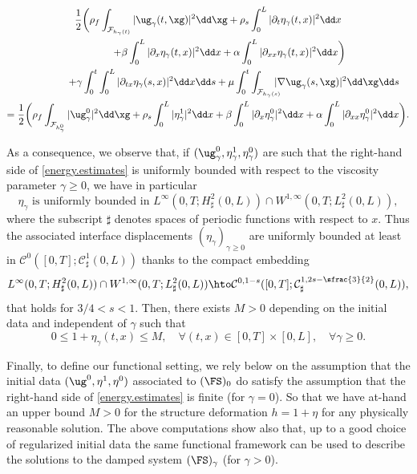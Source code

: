 \begin{multline}\label{energy.estimates}
\frac{1}{2}\biggl(\rho_{f}\int_{\mathcal{F}_{h_{\gamma}(t)}}\vert\ug_{\gamma}(t, \xg) \vert^{2} \dd\xg + \rho_{s}\int_{0}^{L}\vert\partial_{t}\eta_{\gamma}(t, x) \vert^{2} \dd x\\
\hspace*{15mm}+\beta\int_{0}^{L}\vert\partial_{x}\eta_{\gamma}(t, x) \vert^{2} \dd x+\alpha\int_{0}^{L}\vert\partial_{xx}\eta_{\gamma}(t, x) \vert^{2} \dd x \biggr)
\\
\shoveright{+\gamma\int_0^t\int_{0}^{L}\vert\partial_{tx}\eta_{\gamma}(s, x) \vert^{2} \dd x \dd s+ \mu\int_0^t\int_{\mathcal{F}_{h_{\gamma}(s)}}\hspace*{-3mm}\vert \nabla\ug_{\gamma}(s, \xg) \vert^{2} \dd\xg\dd s}\\
=\frac{1}{2}\biggl(\rho_{f}\int_{\mathcal{F}_{h^0_{\gamma}}}\vert\ug^0_{\gamma}\vert^{2} \dd \xg+ \rho_{s}\int_{0}^{L}\vert\eta^1_{\gamma}\vert^{2}\dd x+\beta\int_{0}^{L}\vert\partial_{x}\eta^0_{\gamma}\vert^{2}\dd x+\alpha\int_{0}^{L}\vert\partial_{xx}\eta^0_{\gamma}\vert^{2}\dd x\biggr).
\end{multline}

As a consequence, we observe that, if $(\ug^0_\gamma, \eta^1_\gamma, \eta^0_\gamma)$ are such that the right-hand side of \eqref{energy.estimates} is uniformly bounded with respect to the viscosity parameter $\gamma \geq 0$, we have in particular
\[
\eta_{\gamma}\text{ is uniformly bounded in }L^{\infty}(0,T;H^{2}_{\sharp}(0,L))\cap W^{1,\infty}(0,T;L_{\sharp}^{2}(0,L)),
\]
where the subscript $\sharp$ denotes spaces of periodic functions with respect to $x$.
Thus the associated interface displacements $(\eta_\gamma)_{\gamma \geq 0}$ are uniformly bounded at least in $\mathcal{C}^{0}([0,T];\mathcal{C}^{1}_{\sharp}(0,L))$ thanks to the compact embedding
\begin{equation}
L^{\infty}(0,T;H^{2}_{\sharp}(0,L))\cap W^{1,\infty}(0,T;L_{\sharp}^{2}(0,L))\hto \mathcal{C}^{0,1-s}([0,T];\mathcal{C}^{1,2s-\sfrac{3}{2}}_{\sharp}(0,L)),
\label{inclusion-eta}
\end{equation}
that holds for $3/4<s<1$.
Then, there exists $M>0$ depending on the initial data and independent of $\gamma$ such that
\begin{equation}
\label{borne.eta}
0\leq 1+\eta_\gamma (t, x) \leq M , \quad \forall (t, x) \in [0, T]\times [0, L], \quad \forall\gamma \geq 0.
\end{equation}

Finally, to define our functional setting, we rely below on the assumption that the initial data $(\ug^0, \eta^1, \eta^0)$ associated to $(\FS)_0$ do satisfy the assumption that the right-hand side of \eqref{energy.estimates} is finite (for $\gamma =0$). So that we have at-hand an upper bound $M>0$ for the structure deformation $h=1+\eta$ for any physically reasonable solution.
The above computations show also that, up to a good choice of regularized initial data the same functional framework can be used to describe the solutions to the damped system $(\FS)_{\gamma}$ (for $\gamma >0$).

